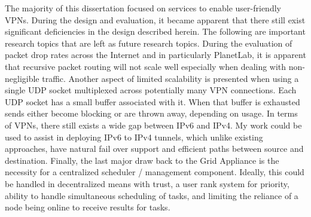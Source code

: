 The majority of this dissertation focused on services to enable user-friendly
VPNs.  During the design and evaluation, it became apparent that there still
exist significant deficiencies in the design described herein.  The following
are important research topics that are left as future research topics.  During
the evaluation of packet drop rates across the Internet and in particularly
PlanetLab, it is apparent that recursive packet routing will not scale well
especially when dealing with non-negligible traffic.  Another aspect of limited
scalability is presented when using a single UDP socket multiplexed across
potentially many VPN connections.  Each UDP socket has a small buffer
associated with it.  When that buffer is exhausted sends either become blocking
or are thrown away, depending on usage.  In terms of VPNs, there still exists a
wide gap between IPv6 and IPv4.  My work could be used to assist in deploying
IPv6 to IPv4 tunnels, which unlike existing approaches, have natural fail over
support and efficient paths between source and destination.  Finally, the last
major draw back to the Grid Appliance is the necessity for a centralized
scheduler / management component.  Ideally, this could be handled in
decentralized means with trust, a user rank system for priority, ability to
handle simultaneous scheduling of tasks, and limiting the reliance of a node
being online to receive results for tasks.
